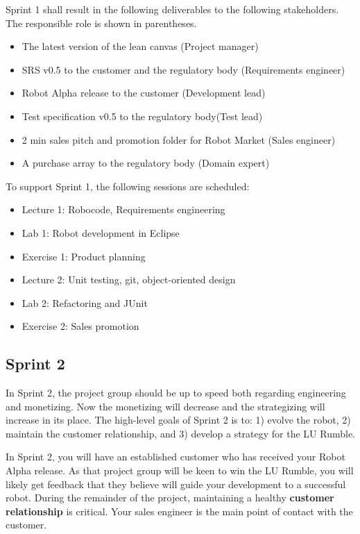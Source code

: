 \documentclass{scrreprt}
\begin{document}
Sprint 1 shall result in the following deliverables to the following stakeholders. The responsible role is shown in parentheses.
\begin{itemize}
\item The latest version of the lean canvas (Project manager)
\item SRS v0.5 to the customer and the regulatory body (Requirements engineer)
\item Robot Alpha release to the customer (Development lead)
\item Test specification v0.5 to the regulatory body(Test lead)
\item 2 min sales pitch and promotion folder for Robot Market (Sales engineer)
\item A purchase array to the regulatory body (Domain expert)
\end{itemize}

To support Sprint 1, the following sessions are scheduled:
\begin{itemize}
\item Lecture 1: Robocode, Requirements engineering
\item Lab 1: Robot development in Eclipse
\item Exercise 1: Product planning
\item Lecture 2: Unit testing, git, object-oriented design
\item Lab 2: Refactoring and JUnit
\item Exercise 2: Sales promotion
\end{itemize}

\subsection{Sprint 2}
In Sprint 2, the project group should be up to speed both regarding engineering and monetizing. Now the monetizing will decrease and the strategizing will increase in its place. The high-level goals of Sprint 2 is to: 1) evolve the robot, 2) maintain the customer relationship, and 3) develop a strategy for the LU Rumble.

In Sprint 2, you will have an established customer who has received your Robot Alpha release. As that project group will be keen to win the LU Rumble, you will likely get feedback that they believe will guide your development to a successful robot. During the remainder of the project, maintaining a healthy \textbf{customer relationship} is critical. Your sales engineer is the main point of contact with the customer.
\end{document}
